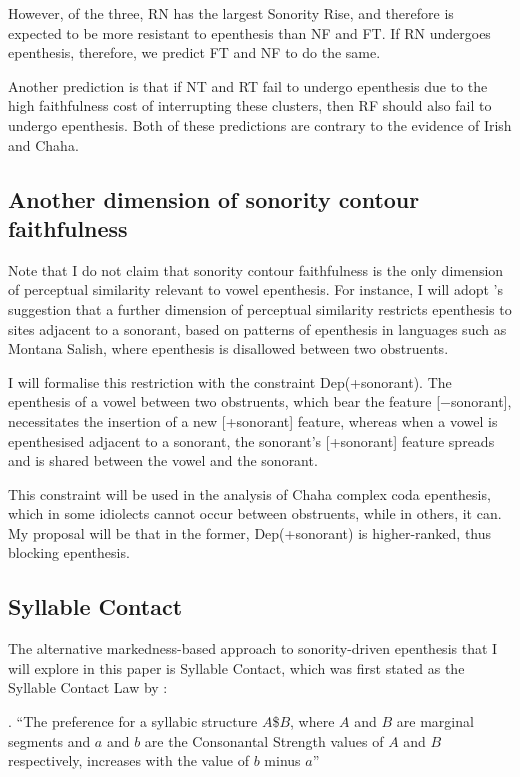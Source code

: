 \documentclass[12pt]{article}
\begin{document}
However, of the three, RN has the largest {\sc Sonority Rise}, and therefore is expected to be more resistant to epenthesis than NF and FT. If RN undergoes epenthesis, therefore, we predict FT and NF to do the same.

Another prediction is that if NT and RT fail to undergo epenthesis due to the high faithfulness cost of interrupting these clusters, then RF should also fail to undergo epenthesis. Both of these predictions are contrary to the evidence of Irish and Chaha.


\subsection{Another dimension of sonority contour faithfulness} \label{depson}

Note that I do not claim that sonority contour faithfulness is the only dimension of perceptual similarity relevant to vowel epenthesis. For instance, I will adopt \citet{flemming.2008}'s suggestion that a further dimension of perceptual similarity restricts epenthesis to sites adjacent to a sonorant, based on patterns of epenthesis in languages such as Montana Salish, where epenthesis is disallowed between two obstruents. 

I will formalise this restriction with the constraint {\sc Dep(+sonorant)}. The epenthesis of a vowel between two obstruents, which bear the feature [$-$sonorant], necessitates the insertion of a new [+sonorant] feature, whereas when a vowel is epenthesised adjacent to a sonorant, the sonorant's [+sonorant] feature spreads and is shared between the vowel and the sonorant.

This constraint will be used in the analysis of Chaha complex coda epenthesis, which in some idiolects
cannot occur between obstruents, while in others, it can. My proposal will be that in the former, {\sc Dep(+sonorant)} is higher-ranked, thus blocking epenthesis.

\subsection{Syllable Contact} 

The alternative markedness-based approach to sonority-driven epenthesis that I will explore in this paper is Syllable Contact, which was first stated as the Syllable Contact Law by \citet{murray.vennemann.1983}:

\ex. ``The preference for a syllabic structure $A$\$$B$, where $A$ and $B$ are marginal segments and $a$ and $b$ are the Consonantal Strength
values of $A$ and $B$ respectively, increases with the value of $b$ minus $a$'' \citep{murray.vennemann.1983}
\end{document}
